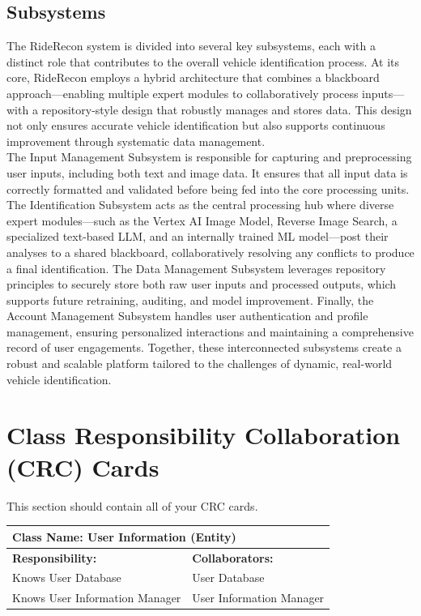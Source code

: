 \documentclass[]{article}
\begin{document}

\subsection{Subsystems}
\label{sub:subsystems}
The RideRecon system is divided into several key subsystems, each with a distinct role that contributes to the overall vehicle identification process. At its core, RideRecon employs a hybrid architecture that combines a blackboard approach—enabling multiple expert modules to collaboratively process inputs—with a repository-style design that robustly manages and stores data. This design not only ensures accurate vehicle identification but also supports continuous improvement through systematic data management.\\

\noindent The Input Management Subsystem is responsible for capturing and preprocessing user inputs, including both text and image data. It ensures that all input data is correctly formatted and validated before being fed into the core processing units. The Identification Subsystem acts as the central processing hub where diverse expert modules—such as the Vertex AI Image Model, Reverse Image Search, a specialized text-based LLM, and an internally trained ML model—post their analyses to a shared blackboard, collaboratively resolving any conflicts to produce a final identification. The Data Management Subsystem leverages repository principles to securely store both raw user inputs and processed outputs, which supports future retraining, auditing, and model improvement. Finally, the Account Management Subsystem handles user authentication and profile management, ensuring personalized interactions and maintaining a comprehensive record of user engagements. Together, these interconnected subsystems create a robust and scalable platform tailored to the challenges of dynamic, real-world vehicle identification.


	
\section{Class Responsibility Collaboration (CRC) Cards}
\label{sec:class_responsibility_collaboration_crc_cards}
This section should contain all of your CRC cards.

\begin{table}[ht]
    \centering
    \begin{tabular}{|p{7cm}|p{7cm}|}
        \hline
        \multicolumn{2}{|l|}{\textbf{Class Name: User Information (Entity)}} \\
        \hline
        \textbf{Responsibility:} & \textbf{Collaborators:} \\
        \hline
        Knows User Database & User Database \\
        Knows User Information Manager & User Information Manager \\
        \hline
    \end{tabular}
\end{table}
\end{document}
